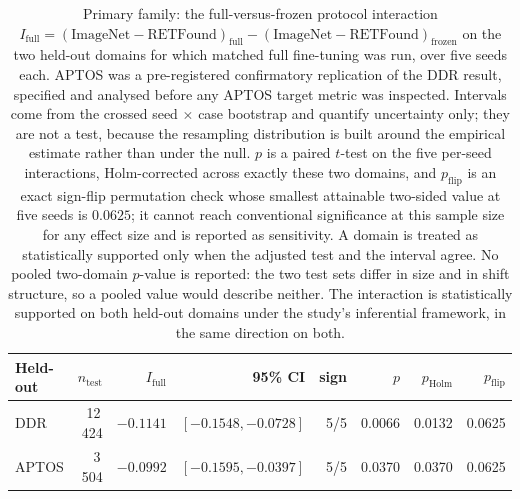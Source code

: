 \begin{table}[t]
\centering
\caption{Primary family: the full-versus-frozen protocol interaction $I_{\text{full}} = (\text{ImageNet}-\text{RETFound})_{\text{full}} - (\text{ImageNet}-\text{RETFound})_{\text{frozen}}$ on the two held-out domains for which matched full fine-tuning was run, over five seeds each. APTOS was a pre-registered confirmatory replication of the DDR result, specified and analysed before any APTOS target metric was inspected. Intervals come from the crossed seed $\times$ case bootstrap and quantify uncertainty only; they are not a test, because the resampling distribution is built around the empirical estimate rather than under the null. $p$ is a paired $t$-test on the five per-seed interactions, Holm-corrected across exactly these two domains, and $p_{\text{flip}}$ is an exact sign-flip permutation check whose smallest attainable two-sided value at five seeds is $0.0625$; it cannot reach conventional significance at this sample size for any effect size and is reported as sensitivity. A domain is treated as statistically supported only when the adjusted test and the interval agree. No pooled two-domain $p$-value is reported: the two test sets differ in size and in shift structure, so a pooled value would describe neither. The interaction is statistically supported on both held-out domains under the study's inferential framework, in the same direction on both.}
\label{tab:two-domain-interaction}
\begin{tabular}{lrrrrrrr}
\toprule
Held-out & $n_{\text{test}}$ & $I_{\text{full}}$ & 95\% CI & sign & $p$ & $p_{\text{Holm}}$ & $p_{\text{flip}}$ \\
\midrule
DDR & 12\,424 & $-0.1141$ & $[-0.1548, -0.0728]$ & 5/5 & 0.0066 & 0.0132 & 0.0625 \\
APTOS & 3\,504 & $-0.0992$ & $[-0.1595, -0.0397]$ & 5/5 & 0.0370 & 0.0370 & 0.0625 \\
\bottomrule
\end{tabular}
\end{table}
